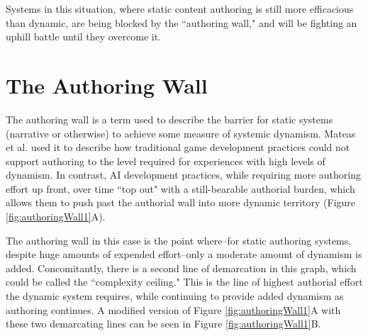 Systems in this situation, where static content authoring is still more efficacious than dynamic, are being blocked by the ``authoring wall," and will be fighting an uphill battle until they overcome it.

\section*{The Authoring Wall}
\label{authoring-wall}

The authoring wall is a term used to describe the barrier for static systems (narrative or otherwise) to achieve some measure of systemic dynamism. Mateas et al. \cite{mateas2012artificial} used it to describe how traditional game development practices could not support authoring to the level required for experiences with high levels of dynamism. In contrast, AI development practices, while requiring more authoring effort up front, over time ``top out" with a still-bearable authorial burden, which allows them to push past the authorial wall into more dynamic territory (Figure \ref{fig:authoringWall1}A).

The authoring wall in this case is the point where--for static authoring systems, despite huge amounts of expended effort--only a moderate amount of dynamism is added. Concomitantly, there is a second line of demarcation in this graph, which could be called the ``complexity ceiling." This is the line of highest authorial effort the dynamic system requires, while continuing to provide added dynamism as authoring continues. A modified version of Figure \ref{fig:authoringWall1}A with these two demarcating lines can be seen in Figure \ref{fig:authoringWall1}B.

